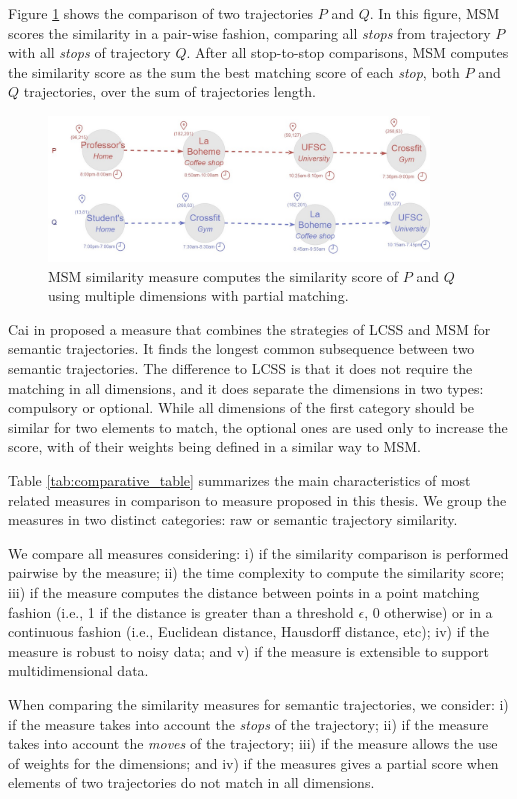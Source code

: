 Figure \ref{fig:related_trajes_MSM} shows the comparison of two trajectories $P$ and $Q$. In this figure, MSM scores the similarity in a pair-wise fashion, comparing all \emph{stops} from trajectory $P$ with all \emph{stops} of trajectory $Q$. After all stop-to-stop comparisons, MSM computes the similarity score as the sum the best matching score of each \emph{stop}, both $P$ and $Q$ trajectories, over the sum of trajectories length.

\begin{figure}[h]
\centering
\includegraphics[width=0.9\textwidth]{Related_Works/Semantic_Trajectories_(MSM).jpg}
\caption{\label{fig:related_trajes_MSM}MSM similarity measure computes the similarity score of $P$ and $Q$ using multiple dimensions with partial matching.}
\end{figure}


Cai in \cite{CaiLee2016} proposed a measure that combines the strategies of LCSS \cite{vlachos2002discovering} and MSM\cite{Furtado:TGIS12156} for semantic trajectories. It finds the longest common subsequence between two semantic trajectories. The difference to LCSS is that it does not require the matching in all dimensions, and it does separate the dimensions in two types: compulsory or optional. While all dimensions of the first category should be similar for two elements to match, the optional ones are used only to increase the score, with of their weights being defined in a similar way to MSM.

{Table {\ref{tab:comparative_table}} summarizes the main characteristics of most related measures in comparison to measure proposed in this thesis. We group the measures in two distinct categories: raw or semantic trajectory similarity.

We compare all measures considering: i) if the similarity comparison is performed pairwise by the measure; ii) the time complexity to compute the similarity score; iii) if the measure computes the distance between points in a point matching fashion (i.e., 1 if the distance is greater than a threshold $\epsilon$, 0 otherwise)  or in a continuous fashion (i.e., Euclidean distance, Hausdorff distance, etc); iv) if the measure is robust to noisy data; and v) if the measure is extensible to support multidimensional data.

When comparing the similarity measures for semantic trajectories, we consider: i) if the measure takes into account the \emph{stops} of the trajectory; ii) if the measure takes into account the \emph{moves} of the trajectory; iii) if the measure allows the use of weights for the dimensions; and iv) if the measures gives a partial score when elements of two trajectories do not match in all dimensions.}

